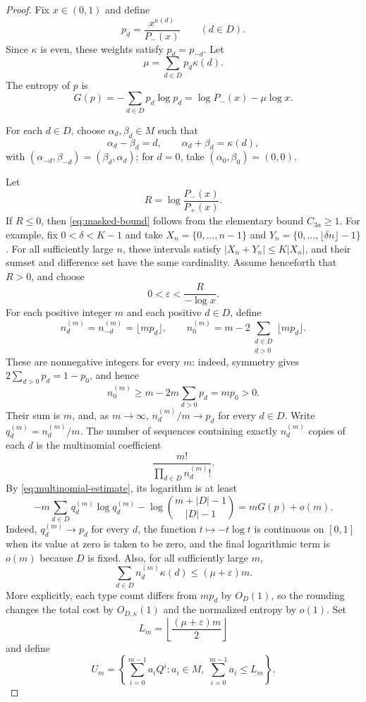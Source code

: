 \documentclass[11pt]{article}
\newcommand{\card}[1]{\lvert #1\rvert}
\begin{document}
\begin{proof}
Fix $x\in(0,1)$ and define
\begin{equation}\label{eq:gibbs}
 p_d=\frac{x^{\kappa(d)}}{P_-(x)}
 \qquad(d\in D).
\end{equation}
Since $\kappa$ is even, these weights satisfy $p_d=p_{-d}$. Let
\[
 \mu=\sum_{d\in D}p_d\kappa(d).
\]
The entropy of $p$ is
\[
 G(p)=-\sum_{d\in D}p_d\log p_d
     =\log P_-(x)-\mu\log x.
\]

For each $d\in D$, choose $\alpha_d,\beta_d\in M$ such that
\[
 \alpha_d-\beta_d=d,
 \qquad
 \alpha_d+\beta_d=\kappa(d),
\]
with $(\alpha_{-d},\beta_{-d})=(\beta_d,\alpha_d)$; for $d=0$, take
$(\alpha_0,\beta_0)=(0,0)$.

Let
\[
 R=\log\frac{P_-(x)}{P_+(x)}.
\]
If $R\le0$, then \eqref{eq:masked-bound} follows from the elementary bound
$C_{3a}\ge1$.  For example, fix $0<\delta<K-1$ and take
$X_n=\{0,\ldots,n-1\}$ and
$Y_n=\{0,\ldots,\lfloor\delta n\rfloor-1\}$.  For all sufficiently large
$n$, these intervals satisfy $\card{X_n+Y_n}\le K\card{X_n}$, and their
sumset and difference set have the same cardinality.  Assume henceforth that $R>0$,
and choose
\[
 0<\varepsilon<\frac{R}{-\log x}.
\]
For each positive integer $m$ and each positive $d\in D$, define
\[
 n_d^{(m)}=n_{-d}^{(m)}=\lfloor mp_d\rfloor,
 \qquad
 n_0^{(m)}=m-2\sum_{\substack{d\in D\\d>0}}\lfloor mp_d\rfloor.
\]
These are nonnegative integers for every $m$: indeed, symmetry gives
$2\sum_{d>0}p_d=1-p_0$, and hence
\[
 n_0^{(m)}\ge m-2m\sum_{d>0}p_d=mp_0>0.
\]
Their sum is $m$, and, as $m\to\infty$,
$n_d^{(m)}/m\to p_d$ for every $d\in D$.  Write
$q_d^{(m)}=n_d^{(m)}/m$.  The number of sequences containing exactly
$n_d^{(m)}$ copies of each $d$ is the multinomial coefficient
\[
 \frac{m!}{\prod_{d\in D}n_d^{(m)}!}.
\]
By \eqref{eq:multinomial-estimate}, its logarithm is at least
\[
 -m\sum_{d\in D}q_d^{(m)}\log q_d^{(m)}
 -\log\binom{m+\card D-1}{\card D-1}
 =mG(p)+o(m).
\]
Indeed, $q_d^{(m)}\to p_d$ for every $d$, the function
$t\mapsto-t\log t$ is continuous on $[0,1]$ when its value at zero is
taken to be zero, and the final logarithmic term is $o(m)$ because $D$ is
fixed.  Also, for all sufficiently
large $m$,
\[
 \sum_{d\in D}n_d^{(m)}\kappa(d)\le(\mu+\varepsilon)m.
\]
More explicitly, each type count differs from $mp_d$ by $O_D(1)$, so the
rounding changes the total cost by $O_{D,\kappa}(1)$ and the normalized
entropy by $o(1)$.
Set
\[
 L_m=\left\lfloor\frac{(\mu+\varepsilon)m}{2}\right\rfloor
\]
and define
\begin{equation}\label{eq:Um}
 U_m=\left\{
   \sum_{i=0}^{m-1}a_iQ^i:
   a_i\in M,\ \sum_{i=0}^{m-1}a_i\le L_m
 \right\}.
\end{equation}


\end{proof}
\end{document}
